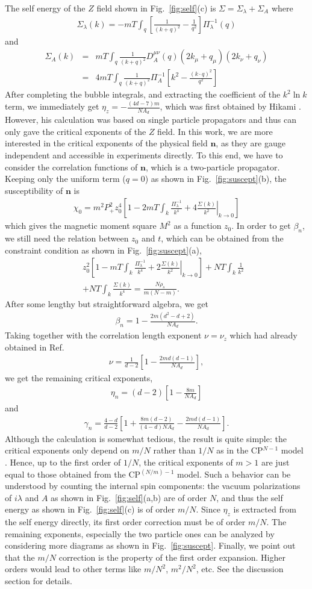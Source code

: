 \documentclass[aps,twocolumn,superscriptaddress]{revtex4-1}
\newcommand{\bea}{\begin{eqnarray}}
\newcommand{\eea}{\end{eqnarray}}
\newcommand{\bn}{\mathbf{n}}
\begin{document}
The self energy of the $Z$ field shown in Fig.~\ref{fig:self}(c) is $\Sigma=\Sigma_\lambda+\Sigma_A$ where \bea
\Sigma_\lambda(k)=-mT\int_q \left[\frac{1}{(k+q)^2}-\frac{1}{q^2}\right]\Pi_\lambda^{-1}(q) \eea and \bea \Sigma_A(k)
&=& mT\int_q \frac{1}{(k+q)^2} D_A^{\mu\nu}(q) (2k_\mu+q_\mu) (2k_\nu+q_\nu) \nonumber \\&=& 4mT\int_q
\frac{1}{(k+q)^2}\Pi_A^{-1}\left[ k^2-\frac{(k\cdot q)^2}{q^2} \right] \eea After completing the bubble integrals, and
extracting the coefficient of the $k^2\ln k$ term, we immediately get $\eta_z=-\frac{(4d-7)m}{NA_d}$, which was first obtained by
Hikami \cite{hikami1980}. However, his calculation was based on single particle propagators and thus can only gave the
critical exponents of the $Z$ field. In this work, we are more interested in the critical exponents of the
physical field $\bn$, as they are gauge independent and accessible in experiments directly. To this end, we have to consider the correlation functions of $\bn$, which is a two-particle
propagator. Keeping only the uniform term ($q=0$) as shown in Fig.~\ref{fig:suscept}(b), the susceptibility of $\bn$ is
\bea \chi_0=m^2P_+^2 z_0^4\left[ 1-  2mT\int_k \frac{\Pi_\lambda^{-1}}{k^4} + 4
\left.\frac{\Sigma(k)}{k^2}\right|_{k\rightarrow0} \right] \eea which gives the magnetic moment square $M^2$ as a
function $z_0$. In order to get $\beta_n$, we still need the relation between $z_0$ and $t$, which can be obtained
from the constraint condition as shown in Fig.~\ref{fig:suscept}(a), \bea &&z_0^2 \left[ 1-
mT\int_k \frac{\Pi_\lambda^{-1}}{k^4} + 2 \left.\frac{\Sigma(k)}{k^2}\right|_{k\rightarrow0}\right] + NT\int_k
\frac{1}{k^2} \nonumber\\&&+ NT\int_k \frac{\Sigma(k)}{k^4} = \frac{N\rho_s}{m(N-m)}. \eea After some lengthy
but straightforward algebra, we get \bea \beta_n=1-\frac{2m(d^2-d+2)}{NA_d}. \eea Taking together with the
correlation length exponent $\nu=\nu_z$ which had already obtained in Ref.~\cite{hikami1980} \bea
\nu=\frac{1}{d-2}\left[ 1-\frac{2md(d-1)}{NA_d} \right], \eea we get the remaining critical exponents, \bea
\eta_n=(d-2)\left[1-\frac{8m}{NA_d}\right] \eea and \bea \gamma_n=\frac{4-d}{d-2}\left[
1+\frac{8m(d-2)}{(4-d)NA_d}-\frac{2md(d-1)}{NA_d} \right]. \eea 
Although the calculation is somewhat tedious, the
result is quite simple: the critical exponents only depend on $m/N$ rather than $1/N$ as in the
CP$^{N-1}$ model \cite{irkhin1996}. Hence, up to the first order of $1/N$, the critical exponents of $m>1$ are just
equal to those obtained from the CP$^{(N/m)-1}$ model. Such a behavior can be understood by counting the internal spin components: the vacuum polarizations of $i\lambda$ and $A$ as shown in Fig.~\ref{fig:self}(a,b) are of order $N$, and thus the self energy as shown in Fig.~\ref{fig:self}(c) is of order $m/N$. Since $\eta_z$ is extracted from the self energy directly, its first order correction must be of order $m/N$. The remaining exponents, especially the two particle ones can be analyzed by considering more diagrams as shown in Fig.~\ref{fig:suscept}. Finally, we point out that the $m/N$ correction is the property of the first order expansion. Higher orders would lead to other terms like $m/N^2$, $m^2/N^2$, etc. See the discussion section for details.
\end{document}
